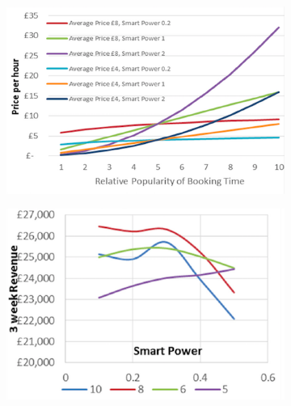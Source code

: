 \documentclass[b5paper,10pt]{article}
\begin{document}
\begin{figure}
\centering
\begin{subfigure}[b]{0.6\textwidth}
  \includegraphics[width=\textwidth]{images/smartpricegraph1.png}
        \caption{}
        \label{fig:smartpricingrates}
\end{subfigure}

\begin{subfigure}[b]{0.6\textwidth}
  \includegraphics[width=\textwidth]{images/smartpricegraph2.png}
        \caption{}
        \label{fig:smartrevenues}
\end{subfigure}


\end{figure}
\end{document}
